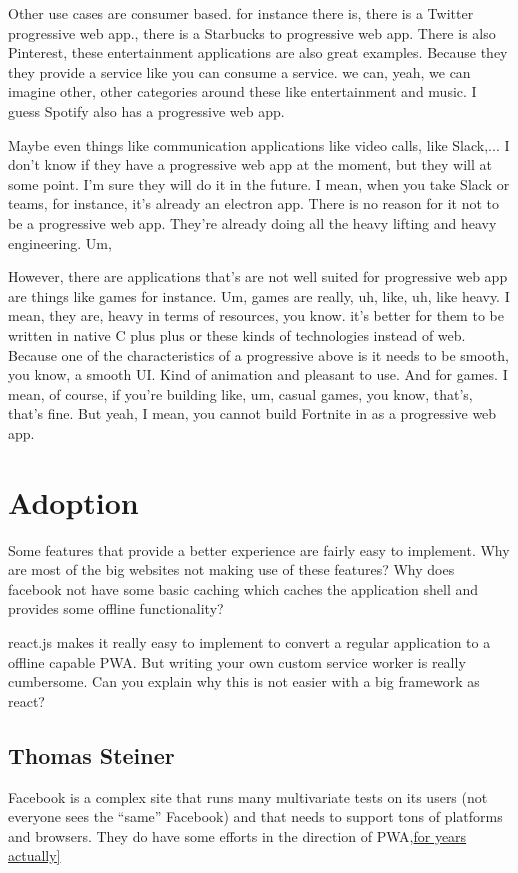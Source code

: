 			 Other use cases are consumer based. for instance there is, there is a Twitter progressive web app., there is a Starbucks to progressive web app. There is also Pinterest, these entertainment applications are also great examples. Because they they provide a service like you can consume a service. we can, yeah, we can imagine other, other categories around these like entertainment and music. I guess Spotify also has a progressive web app. 
				
			 Maybe even things like communication applications like video calls, like Slack,... I don't know if they have a progressive web app at the moment, but they will at some point. I'm sure they will do it in the future. I mean, when you take Slack or teams, for instance, it's already an electron app.  There is no reason for it not to be a progressive web app. They're already doing all the heavy lifting and heavy engineering. Um, 
				
			However, there are applications that's are not well suited for progressive web app are things like games for instance. Um, games are really, uh, like, uh, like heavy. I mean, they are, heavy in terms of resources, you know. it's better for them to be written in native C plus plus or these kinds of technologies instead of web. Because one of the characteristics of a progressive above is it needs to be  smooth, you know, a smooth UI. Kind of animation and pleasant to use. And for games. I mean, of course, if you're building like, um, casual games, you know, that's, that's fine. But yeah, I mean, you cannot build Fortnite in as a progressive web app.
	
	
	\section{Adoption}
		Some features that provide a better experience are fairly easy to implement. 
		Why are most of the big websites not making use of these features?
		Why does facebook not have some basic caching which caches the application shell and provides some offline functionality?
		
		react.js makes it really easy to implement to convert a regular application to a offline capable PWA. But writing your own custom service worker is really cumbersome. Can you explain why this is not easier with a big framework as react?
		

		\subsection{Thomas Steiner}
			Facebook is a complex site that runs many multivariate tests on its users (not everyone sees the “same” Facebook) and that needs to support tons of platforms and browsers. They do have some efforts in the direction of PWA,\href{https://www.google.com/search?q=facebook+install+pwa&oq=facebook+install+pwa&aqs=chrome..69i57j0l2j69i64l2.4656j0j1&sourceid=chrome&ie=UTF-8}{for years actually]}

